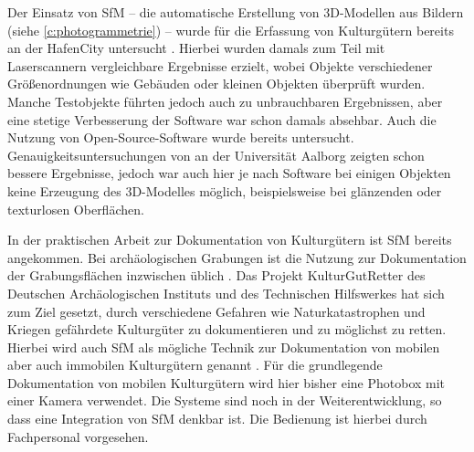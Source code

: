 \documentclass[./00PhotoBox]{subfiles}
\begin{document}
Der Einsatz von \acrfull{SfM} -- die automatische Erstellung von 3D-Modellen aus Bildern (siehe \autoref{c:photogrammetrie}) -- wurde für die Erfassung von Kulturgütern bereits \citeyear{kersten2012} an der HafenCity untersucht \citep{kersten2012}. Hierbei wurden damals zum Teil mit Laserscannern vergleichbare Ergebnisse erzielt, wobei Objekte verschiedener Größenordnungen wie Gebäuden oder kleinen Objekten überprüft wurden. Manche Testobjekte führten jedoch auch zu unbrauchbaren Ergebnissen, aber eine stetige Verbesserung der Software war schon damals absehbar. Auch die Nutzung von Open-Source-Software wurde bereits untersucht. Genauigkeitsuntersuchungen von \cite{IvanNikolov} an der Universität Aalborg zeigten schon bessere Ergebnisse, jedoch war auch hier je nach Software bei einigen Objekten keine Erzeugung des 3D-Modelles möglich, beispielsweise bei glänzenden oder texturlosen Oberflächen.

In der praktischen Arbeit zur Dokumentation von Kulturgütern ist \acrfull{SfM} bereits angekommen. Bei archäologischen Grabungen ist die Nutzung zur Dokumentation der Grabungsflächen inzwischen üblich \citep{grabungen_sfm}.  Das Projekt KulturGutRetter des Deutschen Archäologischen Instituts und des Technischen Hilfswerkes hat sich zum Ziel gesetzt, durch verschiedene Gefahren wie Naturkatastrophen und Kriegen gefährdete Kulturgüter zu dokumentieren und zu möglichst zu retten. Hierbei wird auch \Gls{SfM} als mögliche Technik zur Dokumentation von mobilen aber auch immobilen Kulturgütern genannt \citep[S. 48]{kgr_article}. Für die grundlegende Dokumentation von mobilen Kulturgütern wird hier bisher eine Photobox mit einer Kamera verwendet. Die Systeme sind noch in der Weiterentwicklung, so dass eine Integration von \Gls{SfM} denkbar ist. Die Bedienung ist hierbei durch Fachpersonal vorgesehen. \citep{kulturgutretter}

\biblio
\end{document}

